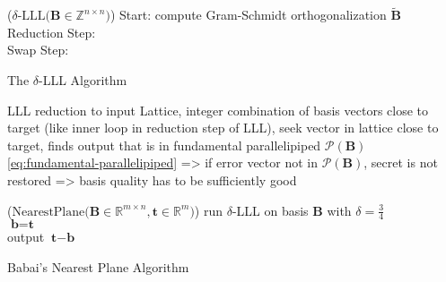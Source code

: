 \begin{algorithm2e}
\Begin($\delta\text{-LLL} {(}\textbf{B} \in \mathbb{Z}^{n\times n} {)}$) %
{
  Start: compute Gram-Schmidt orthogonalization $\tilde{\textbf{B}}$\\
  Reduction Step:\\
  Swap Step:\\
}
\caption{The $\delta$-LLL Algorithm} \label{alg:LLL} 
\end{algorithm2e}%


LLL reduction to input Lattice, integer combination of basis vectors close to target (like inner loop in reduction step of LLL), seek vector in lattice close to target, finds output that is in fundamental parallelipiped $\mathcal{P}(\textbf{B})$ \cref{eq:fundamental-parallelipiped} => if error vector not in $\mathcal{P}(\textbf{B})$, secret is not restored %
=> basis quality has to be sufficiently good
\begin{algorithm2e}
\Begin($\text{NearestPlane} {(}\textbf{B} \in \mathbb{R}^{m \times n},\textbf{t}\in \mathbb{R}^{m}{)}$)
{
  run $\delta$-LLL on basis $\textbf{B}$ with $\delta=\frac{3}{4}$\\ %
  $\textbf{b} = \textbf{t}$\\
  output $\textbf{t} - \textbf{b}$
}
\caption{Babai's Nearest Plane Algorithm \cite{Bab85}}\label{alg:babai} %
\end{algorithm2e}

